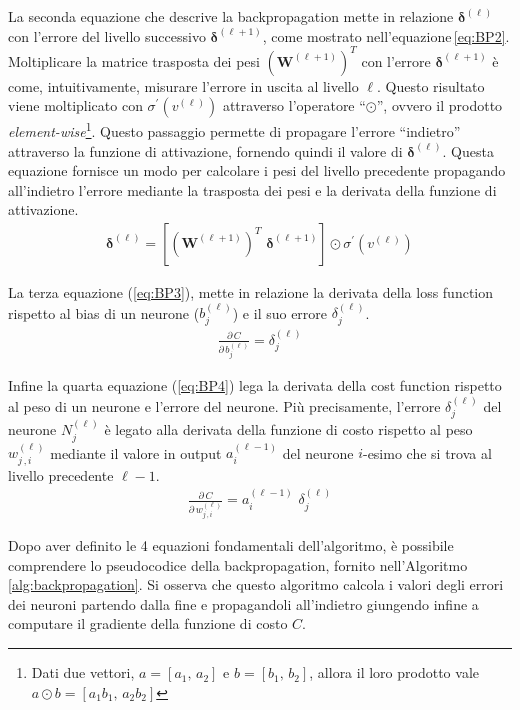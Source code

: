 La seconda equazione che descrive la backpropagation mette in relazione $\boldsymbol{\delta}^{(\ell)}$ con l'errore del livello successivo $\boldsymbol{\delta}^{(\ell + 1)}$, come mostrato nell'equazione\,\ref*{eq:BP2}. Moltiplicare la matrice trasposta dei pesi ${\left( \mathbf{W}^{(\ell + 1)} \right)}^T$ con l'errore $\boldsymbol{\delta}^{(\ell + 1)}$ è come, intuitivamente, misurare l'errore in uscita al livello $\ell$. Questo risultato viene moltiplicato con $\sigma^\prime \left( v^{(\ell)} \right)$ attraverso l'operatore ``$\odot$'', ovvero il prodotto \textit{element-wise}\footnote{Dati due vettori, $a = \left[ a_1,\,a_2\right]$ e $b = \left[ b_1,\,b_2\right]$, allora il loro prodotto vale $ a \odot b = \left[ a_1b_1,\,a_2b_2\right]$}. Questo passaggio permette di propagare l'errore ``indietro'' attraverso la funzione di attivazione, fornendo quindi il valore di $\boldsymbol{\delta}^{(\ell)}$. Questa equazione fornisce un modo per calcolare i pesi del livello precedente propagando all'indietro l'errore mediante la trasposta dei pesi e la derivata della funzione di attivazione.
% 
\begin{gather}
    \boldsymbol{\delta}^{(\ell)} = \left[ {\left( \mathbf{W}^{(\ell + 1)} \right)}^T \,\, \boldsymbol{\delta}^{(\ell + 1)} \right] \odot \sigma^\prime \left( v^{(\ell)} \right)
    \label{eq:BP2}
\end{gather}

La terza equazione (\ref{eq:BP3}), mette in relazione la derivata della loss function rispetto al bias di un neurone ($b^{(\ell)}_j$) e il suo errore $\delta^{(\ell)}_j$.
% 
\begin{gather}
    \frac{\partial\,C}{\partial\,b^{(\ell)}_j} = \delta^{(\ell)}_j
    \label{eq:BP3}
\end{gather}

Infine la quarta equazione (\ref{eq:BP4}) lega la derivata della cost function rispetto al peso di un neurone e l'errore del neurone. Più precisamente, l'errore $\delta^{(\ell)}_j$ del neurone $N^{(\ell)}_j$ è legato alla derivata della funzione di costo rispetto al peso $w^{(\ell)}_{j\,,i}$ mediante il valore in output $a^{(\ell - 1)}_i$ del neurone $i$-esimo che si trova al livello precedente $\ell - 1$. 
% 
\begin{gather}
    \frac{\partial\,C}{\partial\,w^{(\ell)}_{j\,,i}} = a^{(\ell - 1)}_i\,\,\delta^{(\ell)}_j
    \label{eq:BP4}
\end{gather}

Dopo aver definito le 4 equazioni fondamentali dell'algoritmo, è possibile comprendere lo pseudocodice della backpropagation, fornito nell'Algoritmo\,\ref{alg:backpropagation}. Si osserva che questo algoritmo calcola i valori degli errori dei neuroni partendo dalla fine e propagandoli all'indietro giungendo infine a computare il gradiente della funzione di costo $C$.

